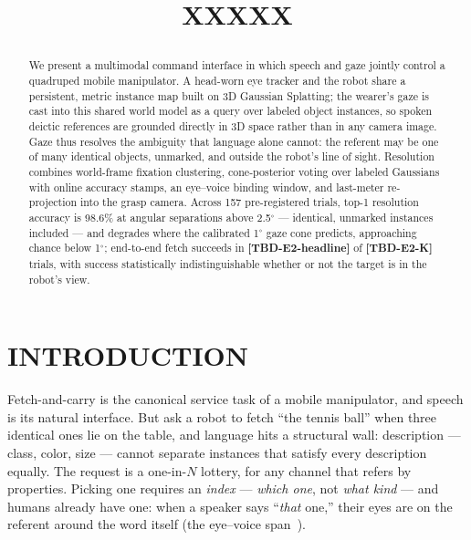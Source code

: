 \documentclass[letterpaper, 10 pt, conference]{ieeeconf}  %
\title{\LARGE \bf XXXXX

}
\author{
}
\newcommand{\TBD}[1]{\textbf{\color{red}[TBD-#1]}}
\begin{document}
\maketitle
\thispagestyle{empty}
\pagestyle{empty}


\begin{abstract}
We present a multimodal command interface in which speech and gaze
jointly control a quadruped mobile manipulator. A head-worn eye
tracker and the robot share a persistent, metric instance map built
on 3D Gaussian Splatting; the wearer's gaze is cast into this shared
world model as a query over labeled object instances, so spoken
deictic references are grounded directly in 3D space rather than in
any camera image. Gaze thus resolves the ambiguity that language
alone cannot: the referent may be one of many identical objects,
unmarked, and outside the robot's line of sight. Resolution combines
world-frame fixation clustering, cone-posterior voting over labeled
Gaussians with online accuracy stamps, an eye--voice binding window,
and last-meter re-projection into the grasp camera. Across 157
pre-registered trials, top-1 resolution accuracy is 98.6\% at
angular separations above 2.5$^\circ$ --- identical, unmarked
instances included --- and degrades where the calibrated
1$^\circ$ gaze cone predicts, approaching chance below
1$^\circ$; end-to-end fetch succeeds in
\TBD{E2-headline} of \TBD{E2-K} trials, with success statistically
indistinguishable whether or not the target is in the robot's view.
\end{abstract}


\section{INTRODUCTION}

Fetch-and-carry is the canonical service task of a mobile manipulator,
and speech is its natural interface. But ask a robot to fetch ``the
tennis ball'' when three identical ones lie on the table, and language
hits a structural wall: description --- class, color, size --- cannot
separate instances that satisfy every description equally. The request
is a one-in-$N$ lottery, for any channel that refers by properties.
Picking one requires an \emph{index} --- \emph{which one}, not
\emph{what kind} --- and humans already have one: when a speaker says
``\emph{that} one,'' their eyes are on the referent around the word
itself (the eye--voice span~\cite{eyevoicespan}).
\end{document}
